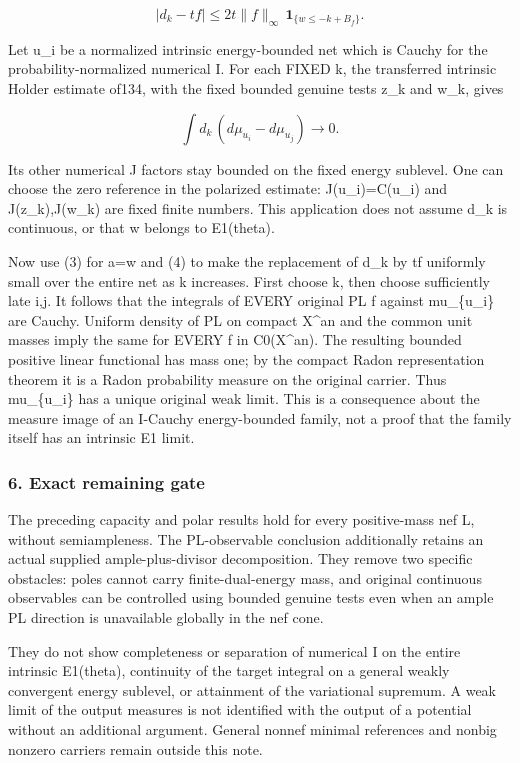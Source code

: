 \documentclass[
]{article}
\begin{document}
\[|d_k-tf|\leq2t\|f\|_\infty\,
\mathbf1_{\{w\leq-k+B_f\}}.\tag{4}\]

Let u\_i be a normalized intrinsic energy-bounded net which is Cauchy
for the probability-normalized numerical I. For each FIXED k, the
transferred intrinsic Holder estimate of134, with the fixed bounded
genuine tests z\_k and w\_k, gives

\[\int d_k\,(d\mu_{u_i}-d\mu_{u_j})\longrightarrow0.\]

Its other numerical J factors stay bounded on the fixed energy sublevel.
One can choose the zero reference in the polarized estimate:
J(u\_i)=C(u\_i) and J(z\_k),J(w\_k) are fixed finite numbers. This
application does not assume d\_k is continuous, or that w belongs to
E1(theta).

Now use (3) for a=w and (4) to make the replacement of d\_k by tf
uniformly small over the entire net as k increases. First choose k, then
choose sufficiently late i,j. It follows that the integrals of EVERY
original PL f against mu\_\{u\_i\} are Cauchy. Uniform density of PL on
compact X\^{}an and the common unit masses imply the same for EVERY f in
C0(X\^{}an). The resulting bounded positive linear functional has mass
one; by the compact Radon representation theorem it is a Radon
probability measure on the original carrier. Thus mu\_\{u\_i\} has a
unique original weak limit. This is a consequence about the measure
image of an I-Cauchy energy-bounded family, not a proof that the family
itself has an intrinsic E1 limit.

\subsubsection{6. Exact remaining gate}\label{exact-remaining-gate}

The preceding capacity and polar results hold for every positive-mass
nef L, without semiampleness. The PL-observable conclusion additionally
retains an actual supplied ample-plus-divisor decomposition. They remove
two specific obstacles: poles cannot carry finite-dual-energy mass, and
original continuous observables can be controlled using bounded genuine
tests even when an ample PL direction is unavailable globally in the nef
cone.

They do not show completeness or separation of numerical I on the entire
intrinsic E1(theta), continuity of the target integral on a general
weakly convergent energy sublevel, or attainment of the variational
supremum. A weak limit of the output measures is not identified with the
output of a potential without an additional argument. General nonnef
minimal references and nonbig nonzero carriers remain outside this note.
\end{document}
